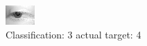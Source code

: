 \begin{figure}[h!]
\begin{center}
\includegraphics[width=0.60\columnwidth]{figures/ID2709_class_3_target_4.png}
\end{center}
\caption{ Classification: 3 actual target: 4}
\label{fig:ID2709_class_3_target_4}
\end{figure}
